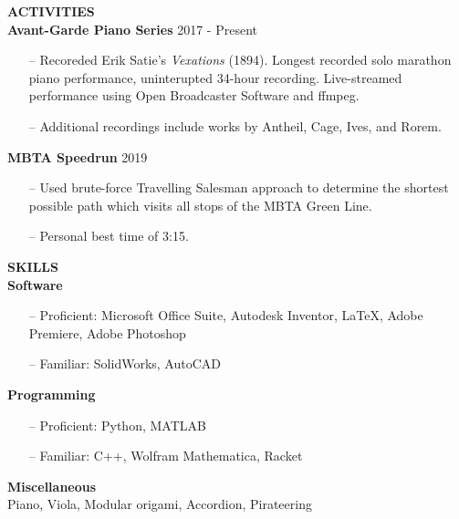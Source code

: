 \documentclass[10pt,a4paper]{article} %
\begin{document}
	\textbf{\LARGE{ACTIVITIES}}\\[6pt]
	\textbf{\Large{Avant-Garde Piano Series}} \hfill 2017 - Present
		\begin{enumerate}[noitemsep]
			\item[--] Recoreded Erik Satie's \textit{Vexations} (1894). Longest recorded solo marathon piano performance, uninterupted 34-hour recording. Live-streamed performance using Open Broadcaster Software and ffmpeg.
			\item[--] Additional recordings include works by Antheil, Cage, Ives, and Rorem.
		\end{enumerate}
	\textbf{\Large{MBTA Speedrun}} \hfill 2019
		\begin{enumerate}[noitemsep]
			\item[--] Used brute-force Travelling Salesman approach to determine the shortest possible path which visits all stops of the MBTA Green Line.
			\item[--] Personal best time of 3:15.
		\end{enumerate}
	\textbf{\LARGE{SKILLS}}\\[6pt]
		\textbf{\Large{Software}} 
			\begin{enumerate}[noitemsep]
				\item[--] Proficient: Microsoft Office Suite, Autodesk Inventor, \LaTeX , Adobe Premiere, Adobe Photoshop
				\item[--] Familiar: SolidWorks, AutoCAD
			\end{enumerate}
		\textbf{\Large{Programming}} 
			\begin{enumerate}[noitemsep]
				\item[--] Proficient: Python, MATLAB
				\item[--] Familiar: C++, Wolfram Mathematica, Racket
			\end{enumerate}
		\textbf{\Large{Miscellaneous}}\\
			Piano, Viola, Modular origami, Accordion, Pirateering
		
\end{document}
